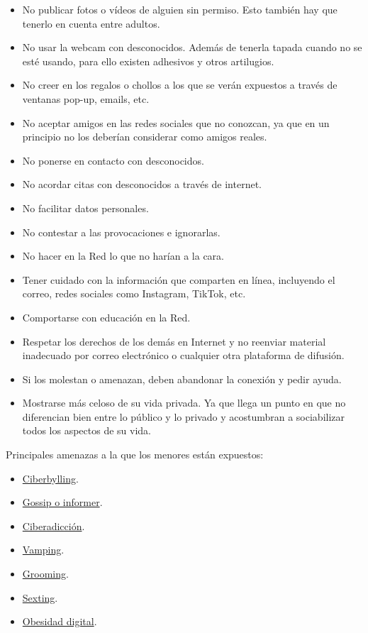 \documentclass[
  spanish,
  a4paper,
  openany]{book}
\begin{document}
\begin{itemize}
\item
  No publicar fotos o vídeos de alguien sin permiso. Esto también hay que tenerlo en cuenta entre adultos.
\item
  No usar la webcam con desconocidos. Además de tenerla tapada cuando no se esté usando, para ello existen adhesivos y otros artilugios.
\item
  No creer en los regalos o chollos a los que se verán expuestos a través de ventanas pop-up, emails, etc.
\item
  No aceptar amigos en las redes sociales que no conozcan, ya que en un principio no los deberían considerar como amigos reales.
\item
  No ponerse en contacto con desconocidos.
\item
  No acordar citas con desconocidos a través de internet.
\item
  No facilitar datos personales.
\item
  No contestar a las provocaciones e ignorarlas.
\item
  No hacer en la Red lo que no harían a la cara.
\item
  Tener cuidado con la información que comparten en línea, incluyendo el correo, redes sociales como Instagram, TikTok, etc.
\item
  Comportarse con educación en la Red.
\item
  Respetar los derechos de los demás en Internet y no reenviar material inadecuado por correo electrónico o cualquier otra plataforma de difusión.
\item
  Si los molestan o amenazan, deben abandonar la conexión y pedir ayuda.
\item
  Mostrarse más celoso de su vida privada. Ya que llega un punto en que no diferencian bien entre lo público y lo privado y acostumbran a sociabilizar todos los aspectos de su vida.
\end{itemize}

Principales amenazas a la que los menores están expuestos:

\begin{itemize}
\item
  \href{https://ayudaenaccion.org/ong/blog/educacion/ciberbullying/}{Ciberbylling}.
\item
  \href{https://educacion2.com/que-es-el-fenomeno-gossip-e-informer/}{Gossip o informer}.
\item
  \href{https://www.aepap.org/sites/default/files/pags._131-142_ciberadicciones.pdf}{Ciberadicción}.
\item
  \href{https://www.educapeques.com/escuela-de-padres/vamping-definicion.html}{Vamping}.
\item
  \href{https://www.is4k.es/necesitas-saber/grooming}{Grooming}.
\item
  \href{https://www.is4k.es/menores-y-sexting}{Sexting}.
\item
  \href{https://www.levantalacabeza.es/obesidad-digital/}{Obesidad digital}.
\end{itemize}
\end{document}
